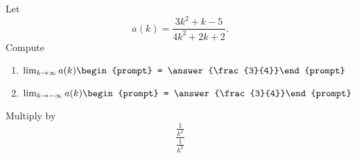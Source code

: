 \documentclass{ximera}
\author{Bart Snapp}
\begin{document}
\begin{exercise}
Let 
\[
a(k) = \frac{3 k^2+k-5}{4 k^2+2 k+2}.
\]
Compute
\begin{enumerate}
\item $\lim_{k\to \infty} a(k) \begin{prompt} = \answer{\frac{3}{4}}\end{prompt}$
\item $\lim_{k\to -\infty}a(k) \begin{prompt} = \answer{\frac{3}{4}}\end{prompt}$
\end{enumerate}
\begin{hint}
Multiply by
\[
\frac{\frac{1}{k^2}}{\frac{1}{k^2}}
\]
\end{hint}
\end{exercise}
\end{document}
